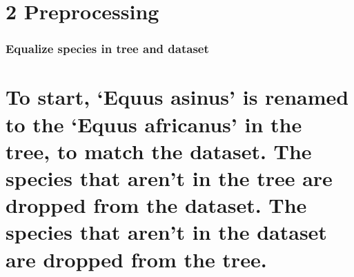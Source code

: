 \documentclass[
]{article}
\newenvironment{Shaded}{\begin{snugshade}}{\end{snugshade}}
\newcommand{\CommentTok}[1]{\textcolor[rgb]{0.56,0.35,0.01}{\textit{#1}}}
\newcommand{\KeywordTok}[1]{\textcolor[rgb]{0.13,0.29,0.53}{\textbf{#1}}}
\newcommand{\NormalTok}[1]{#1}
\newcommand{\OperatorTok}[1]{\textcolor[rgb]{0.81,0.36,0.00}{\textbf{#1}}}
\newcommand{\StringTok}[1]{\textcolor[rgb]{0.31,0.60,0.02}{#1}}
\begin{document}
\hypertarget{preprocessing}{%
\section{2 Preprocessing}\label{preprocessing}}

\hypertarget{equalize-species-in-tree-and-dataset}{%
\subsubsection{Equalize species in tree and
dataset}\label{equalize-species-in-tree-and-dataset}}

\hypertarget{to-start-equus-asinus-is-renamed-to-the-equus-africanus-in-the-tree-to-match-the-dataset.-the-species-that-arent-in-the-tree-are-dropped-from-the-dataset.-the-species-that-arent-in-the-dataset-are-dropped-from-the-tree.}{%
\section{To start, `Equus asinus' is renamed to the `Equus africanus' in
the tree, to match the dataset. The species that aren't in the tree are
dropped from the dataset. The species that aren't in the dataset are
dropped from the
tree.}\label{to-start-equus-asinus-is-renamed-to-the-equus-africanus-in-the-tree-to-match-the-dataset.-the-species-that-arent-in-the-tree-are-dropped-from-the-dataset.-the-species-that-arent-in-the-dataset-are-dropped-from-the-tree.}}

\begin{Shaded}
\end{Shaded}
\end{document}
